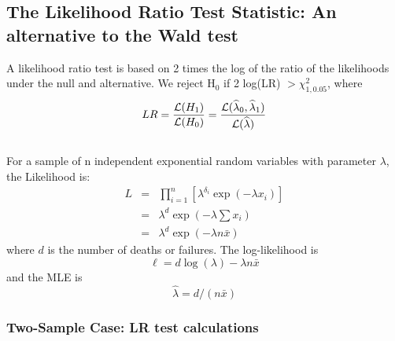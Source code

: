 \documentclass[11pt,psfig]{book}
\begin{document}
\subsection{The Likelihood Ratio Test Statistic:
An alternative to the Wald test}
A likelihood ratio test is based on 2 times the log of the
ratio of the likelihoods under the null and alternative.
We reject  H$_0$ if 2 log(LR) $> \chi^2_{1,0.05}$, where
\[ LR  = \frac{{\cal L}(H_1)}{{\cal L}(H_0)}  =
\frac{{\cal L}(\widehat{\lambda}_0,\widehat{\lambda}_1)}
{{\cal L}(\widehat{\lambda})} \]
\\[2ex]
For a sample of n independent exponential random
variables with parameter $\lambda$,  the  Likelihood is:\\
\begin{eqnarray*}
  L &  = &  \prod_{i=1}^{n} [\lambda^{\delta_i} \exp(-\lambda x_i)]\\
    &  = &  \lambda^{d} \exp(-\lambda \sum x_i)\\
    &  = &  \lambda^{d} \exp(-\lambda n \bar{x})
\end{eqnarray*}
where $d$ is the number of deaths or failures.  The  log-likelihood is
\[ \ell = d \log(\lambda)  - \lambda n \bar{x}\]
and the MLE is \[ \widehat{\lambda}=d/(n \bar{x})\]
\subsubsection{Two-Sample Case:  LR test calculations}
\end{document}
